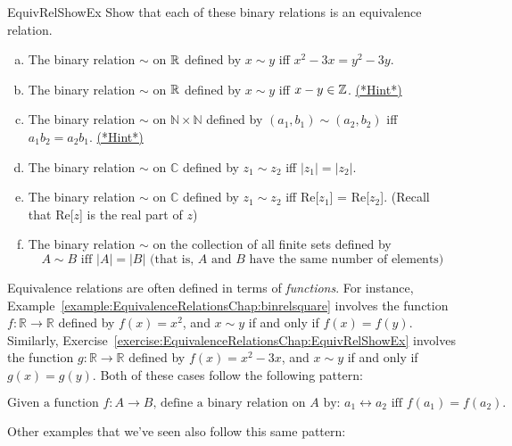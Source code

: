 \begin{exercise}{EquivRelShowEx}
Show that each of these binary relations is an equivalence relation.
\begin{enumerate}[(a)]
\item \label{EquivRelShowEx-x2min3x}
The binary relation $\sim$ on $\mathbb{R}$ defined by $x \sim y$ iff $x^2 - 3x = y^2 - 3y$.
\item \label{EquivRelShowEx-xminyinZ}
The binary relation $\sim$ on $\mathbb{R}$ defined by $x \sim y$ iff $x - y \in \mathbb{Z}$.
\hyperref[secEqRelChapHints]{(*Hint*)}
\item \label{EquivRelShowEx-ab=ab}
The binary relation $\sim$ on $\mathbb{N} \times \mathbb{N}$ defined by $(a_1,b_1) \sim (a_2,b_2)$ iff $a_1 b_2 = a_2 b_1$.
\hyperref[secEqRelChapHints]{(*Hint*)}
\item \label{EquivRelComplex1}
The binary relation $\sim$ on $\mathbb{C}$ defined by $z_1 \sim z_2$ iff $|z_1|=|z_2|$.
\item \label{EquivRelComplex1}
The binary relation $\sim$ on $\mathbb{C}$  defined by $z_1 \sim z_2$ iff Re[$z_1$] = Re[$z_2$].  (Recall that Re[$z$] is the real part of $z$)
\item
The binary relation $\sim$ on the collection of all finite sets defined by
\[  A \sim B  \text{ iff } |A|=|B|  \text{  (that is, }A \text{ and } B \text{ have the same number of elements)} \]
\end{enumerate}
\end{exercise}


Equivalence relations are often defined in terms of \emph{functions}.  For instance,  Example~\ref{example:EquivalenceRelationsChap:binrelsquare}  involves the function $f: \mathbb{R} \rightarrow 
\mathbb{R}$ defined by $f(x)=x^2$, and $x \sim y$ if and only if $f(x) = f(y)$.  Similarly, Exercise~\ref{exercise:EquivalenceRelationsChap:EquivRelShowEx} involves the function 
$g: \mathbb{R} \rightarrow 
\mathbb{R}$ defined by $f(x)=x^2-3x$, and $x \sim y$ if and only if $g(x) = g(y)$.
Both of these cases follow the following pattern:

\begin{equation*}
\mbox{Given a function $f: A \rightarrow B$, define a binary relation on $A$ by: $a_1 \rel a_2$ iff $f(a_1) = f(a_2)$.}
\end{equation*}

Other examples that we've seen also follow this same pattern:

